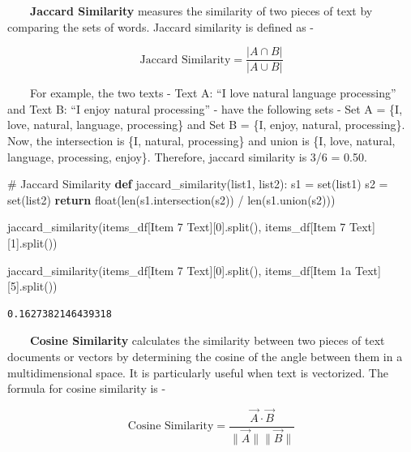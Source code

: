 \documentclass[
  letterpaper,
  DIV=11,
  numbers=noendperiod]{scrreprt}
\newenvironment{Shaded}{\begin{snugshade}}{\end{snugshade}}
\newcommand{\BuiltInTok}[1]{\textcolor[rgb]{0.00,0.23,0.31}{#1}}
\newcommand{\CommentTok}[1]{\textcolor[rgb]{0.37,0.37,0.37}{#1}}
\newcommand{\ControlFlowTok}[1]{\textcolor[rgb]{0.00,0.23,0.31}{\textbf{#1}}}
\newcommand{\DecValTok}[1]{\textcolor[rgb]{0.68,0.00,0.00}{#1}}
\newcommand{\KeywordTok}[1]{\textcolor[rgb]{0.00,0.23,0.31}{\textbf{#1}}}
\newcommand{\NormalTok}[1]{\textcolor[rgb]{0.00,0.23,0.31}{#1}}
\newcommand{\OperatorTok}[1]{\textcolor[rgb]{0.37,0.37,0.37}{#1}}
\newcommand{\StringTok}[1]{\textcolor[rgb]{0.13,0.47,0.30}{#1}}
\begin{document}
~~~~\textbf{Jaccard Similarity} measures the similarity of two pieces of
text by comparing the sets of words. Jaccard similarity is defined as -

\[\text{Jaccard Similarity} = \frac{|A \cap B|}{|A \cup B|}\]

~~~~For example, the two texts - Text A: ``I love natural language
processing'' and Text B: ``I enjoy natural processing'' - have the
following sets - Set A = \{I, love, natural, language, processing\} and
Set B = \{I, enjoy, natural, processing\}. Now, the intersection is \{I,
natural, processing\} and union is \{I, love, natural, language,
processing, enjoy\}. Therefore, jaccard similarity is 3/6 = 0.50.

\begin{Shaded}
\begin{Highlighting}[]
\CommentTok{\# Jaccard Similarity }
\KeywordTok{def}\NormalTok{ jaccard\_similarity(list1, list2):}
\NormalTok{    s1 }\OperatorTok{=} \BuiltInTok{set}\NormalTok{(list1)}
\NormalTok{    s2 }\OperatorTok{=} \BuiltInTok{set}\NormalTok{(list2)}
    \ControlFlowTok{return} \BuiltInTok{float}\NormalTok{(}\BuiltInTok{len}\NormalTok{(s1.intersection(s2)) }\OperatorTok{/} \BuiltInTok{len}\NormalTok{(s1.union(s2)))}

\NormalTok{jaccard\_similarity(items\_df[}\StringTok{\textquotesingle{}Item 7 Text\textquotesingle{}}\NormalTok{][}\DecValTok{0}\NormalTok{].split(),}
\NormalTok{                items\_df[}\StringTok{\textquotesingle{}Item 7 Text\textquotesingle{}}\NormalTok{][}\DecValTok{1}\NormalTok{].split())}

\NormalTok{jaccard\_similarity(items\_df[}\StringTok{\textquotesingle{}Item 7 Text\textquotesingle{}}\NormalTok{][}\DecValTok{0}\NormalTok{].split(),}
\NormalTok{                items\_df[}\StringTok{\textquotesingle{}Item 1a Text\textquotesingle{}}\NormalTok{][}\DecValTok{5}\NormalTok{].split())}
\end{Highlighting}
\end{Shaded}

\begin{verbatim}
0.1627382146439318
\end{verbatim}

~~~~\textbf{Cosine Similarity} calculates the similarity between two
pieces of text documents or vectors by determining the cosine of the
angle between them in a multidimensional space. It is particularly
useful when text is vectorized. The formula for cosine similarity is -

\[\text{Cosine Similarity} = \frac{\vec{A} \cdot \vec{B}}{\|\vec{A}\| \|\vec{B}\|}\]
\end{document}
